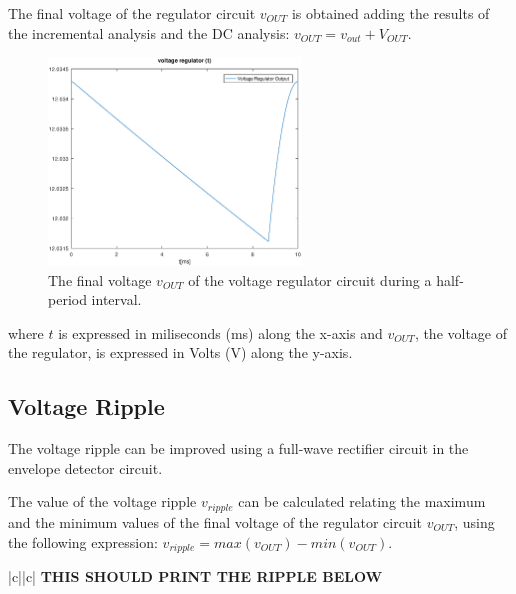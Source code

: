 The final voltage of the regulator circuit $v_{OUT}$ is obtained adding the results of the incremental analysis and the DC analysis: $v_{OUT}=v_{out}+V_{OUT}$.

\begin{figure}[H] \centering
\includegraphics[width=0.6\textwidth]{output.eps}
\caption{The final voltage $v_{OUT}$ of the voltage regulator circuit during a half-period interval.}
\label{fig:output}
\end{figure}

where $t$ is expressed in miliseconds (ms) along the x-axis and 
$v_{OUT}$, the voltage of the regulator, is expressed in Volts (V) along the y-axis.

\subsection{Voltage Ripple}
\label{subsec:ripple}

The voltage ripple can be improved using a full-wave rectifier circuit in the envelope detector circuit. 

The value of the voltage ripple $v_{ripple}$ can be calculated relating the maximum and the minimum values of the final voltage of the regulator circuit $v_{OUT}$, using the following expression: $v_{ripple}=max(v_{OUT})-min(v_{OUT})$.

\begin{center}
   \begin{tabular}{|c||c|}
      \hline    
       {\bf THIS SHOULD PRINT THE RIPPLE BELOW} \\
      \hline
        
   \end{tabular}
 \end{center}

